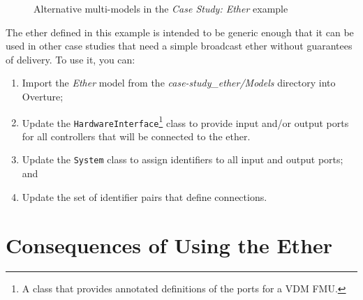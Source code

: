 \begin{figure}
\begin{center}
\caption{Alternative multi-models in the \emph{Case Study: Ether} example}
\label{fig:cds}
\end{center}
\end{figure}

The ether defined in this example is intended to be generic enough that it can be used in other case studies that need a simple broadcast ether without guarantees of delivery. To use it, you can:

\begin{enumerate}[noitemsep]
\item Import the \emph{Ether} model from the \emph{case-study\_ether/Models} directory into Overture;
\item Update the \texttt{HardwareInterface}\footnote{A class that provides annotated definitions of the ports for a VDM FMU.} class to provide input and/or output ports for all controllers that will be connected to the ether.
\item Update the \texttt{System} class to assign identifiers to all input and output ports; and
\item Update the set of identifier pairs that define connections.
\end{enumerate}

\section{Consequences of Using the Ether}

